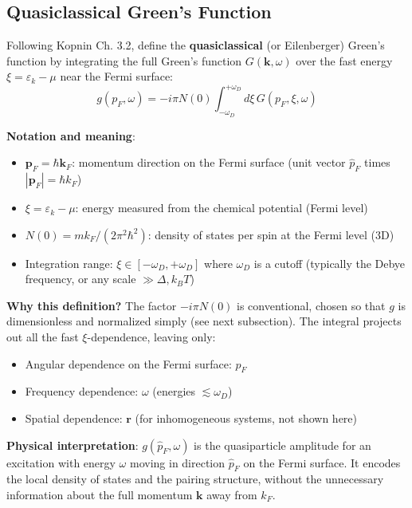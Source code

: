 \documentclass[12pt]{article}
\begin{document}
\subsection{Quasiclassical Green's Function}

Following Kopnin Ch. 3.2, define the \textbf{quasiclassical} (or Eilenberger) Green's function by integrating the full Green's function $G(\mathbf{k}, \omega)$ over the fast energy $\xi = \varepsilon_k - \mu$ near the Fermi surface:
\begin{equation}
\boxed{
g(p_F, \omega) = -i\pi N(0) \int_{-\omega_D}^{+\omega_D} d\xi \, G(p_F, \xi, \omega)
}
\end{equation}

\textbf{Notation and meaning}:
\begin{itemize}
\item $\mathbf{p}_F = \hbar\mathbf{k}_F$: momentum direction on the Fermi surface (unit vector $\hat{p}_F$ times $|\mathbf{p}_F| = \hbar k_F$)
\item $\xi = \varepsilon_k - \mu$: energy measured from the chemical potential (Fermi level)
\item $N(0) = m k_F/(2\pi^2\hbar^2)$: density of states per spin at the Fermi level (3D)
\item Integration range: $\xi \in [-\omega_D, +\omega_D]$ where $\omega_D$ is a cutoff (typically the Debye frequency, or any scale $\gg \Delta, k_B T$)
\end{itemize}

\textbf{Why this definition?} The factor $-i\pi N(0)$ is conventional, chosen so that $g$ is dimensionless and normalized simply (see next subsection). The integral projects out all the fast $\xi$-dependence, leaving only:
\begin{itemize}
\item Angular dependence on the Fermi surface: $\hat{p}_F$
\item Frequency dependence: $\omega$ (energies $\lesssim \omega_D$)
\item Spatial dependence: $\mathbf{r}$ (for inhomogeneous systems, not shown here)
\end{itemize}

\textbf{Physical interpretation}: $g(\hat{p}_F, \omega)$ is the quasiparticle amplitude for an excitation with energy $\omega$ moving in direction $\hat{p}_F$ on the Fermi surface. It encodes the local density of states and the pairing structure, without the unnecessary information about the full momentum $\mathbf{k}$ away from $k_F$.
\end{document}
